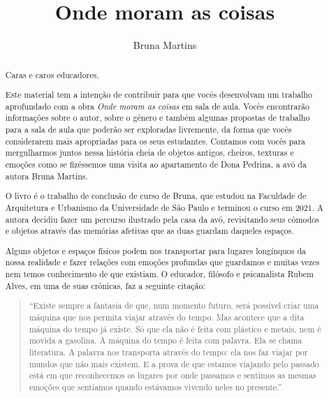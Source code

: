 \documentclass[11pt]{extarticle}
\newcommand{\AutorLivro}{Bruna Martins}
\newcommand{\TituloLivro}{Onde moram as coisas}
\newcommand{\colaborador}{Gabriela Karam}
\begin{document}
\title{\TituloLivro}
\author{\AutorLivro}
\def\authornotes{\colaborador}

\date{}
\maketitle


\tableofcontents


\begin{abstract}
Caras e caros educadores,

Este material tem a intenção de contribuir para que vocês desenvolvam um trabalho aprofundado com a obra \textit{Onde moram as coisas} em sala de aula.
Vocês encontrarão informações sobre o autor, sobre o gênero e também 
algumas propostas de trabalho para a sala de aula que poderão ser exploradas livremente, 
da forma que vocês considerarem mais apropriadas para os seus estudantes. Contamos com vocês para mergulharmos juntos nessa história cheia de objetos antigos, cheiros, texturas e emoções como se fizéssemos uma visita ao apartamento de Dona Pedrina, a avó da autora Bruna Martins. 

O livro é o trabalho de conclusão de curso de Bruna, que estudou na Faculdade de Arquitetura e Urbanismo da Universidade de São Paulo e terminou o curso em 2021. A autora decidiu fazer um percurso ilustrado pela casa da avó, revisitando seus cômodos e objetos através das memórias afetivas que as duas guardam daqueles espaços. 

Alguns objetos e espaços físicos podem nos transportar para lugares longínquos da nossa realidade e fazer relações com emoções profundas que guardamos e muitas vezes nem temos conhecimento de que existiam. O educador, filósofo e psicanalista Rubem Alves, em uma de suas crônicas, faz a seguinte citação:

\begin{quote}

``Existe sempre a fantasia de que, num momento futuro, será possível criar uma máquina que nos permita viajar através do tempo. Mas acontece que a dita máquina do tempo já existe. Só que ela não é feita com plástico e metais, nem é movida a gasolina. A máquina do tempo é feita com palavra. Ela se chama literatura. A palavra nos transporta através do tempo: ela nos faz viajar por mundos que não mais existem. E a prova de que estamos viajando pelo passado está em que reconhecemos os lugares por onde passamos e sentimos as mesmas emoções que sentíamos quando estávamos vivendo neles no presente.''


\end{quote}
\end{abstract}
\end{document}
